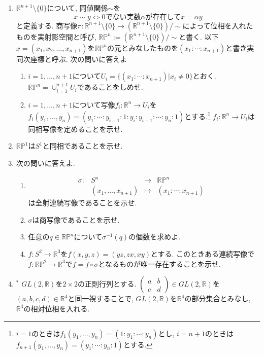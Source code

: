 \documentclass[dvipdfmx,a4paper,11pt]{article}
\newcommand{\R}{\mathbb{R}}
\theoremstyle{definition}
\begin{document}
\begin{enumerate}[ label=\textbf{問}6.\arabic*]
\item $\R^{n+1} \setminus \{ 0\}$について, 同値関係$\sim$を
	$$
	x \sim y \Leftrightarrow \text{0でない実数$\alpha$が存在して$x = \alpha y$}
	$$
	と定義する. 商写像$\pi : \R^{n+1} \setminus \{ 0\} \rightarrow (\R^{n+1} \setminus \{ 0\})/\sim$によって位相を入れたものを実射影空間と呼び, $ \R\mathbb{P}^{n}:= (\R^{n+1} \setminus \{ 0\})/\sim$と書く.  以下$x= (x_{1}, x_{2}, \ldots, x_{n+1})$を$\R\mathbb{P}^{n}$の元とみなしたものを$(x_{1}: \cdots : x_{n+1})$と書き実同次座標と呼ぶ. 
次の問いに答えよ
	\begin{enumerate}
	\item $i=1,\ldots, n+1$について$U_{i} = \{(x_{1}: \cdots : x_{n+1}) | x_i \neq 0\}$とおく. $\R\mathbb{P}^{n} = \cup_{i=1}^{n+1}U_i$であることをしめせ.
    	\item $i=1,\ldots, n+1$について写像$f_i : \R^{n} \rightarrow U_i$を$f_i(y_1, \ldots,y_{n})=(y_1: \cdots :y_{i-1}:1:y_i:y_{i+1}:\cdots : y_{n}:1 )$とする.\footnote{$i=1$のときは$f_1(y_1, \ldots,y_{n})=(1:y_1:\cdots : y_{n} )$とし, $i=n+1$のときは$f_{n+1}(y_1, \ldots,y_{n})=(y_1:\cdots : y_{n}:1 )$とする.}
	$f_i : \R^{n} \rightarrow U_i$は同相写像を定めることを示せ.
	\end{enumerate}
\item $ \R\mathbb{P}^{1}$は$S^1$と同相であることを示せ.
\item 次の問いに答えよ.	
	\begin{enumerate}
	\item 
	$$
\begin{array}{ccccc}
\sigma: &S^{n}& \rightarrow & \R\mathbb{P}^{n}& \\
&(x_{1}, \ldots, x_{n+1}) & \longmapsto & 
(x_{1}: \cdots : x_{n+1})&
\end{array}
$$
は全射連続写像であることを示せ.
	\item $\sigma$は商写像であることを示せ. 
	\item 任意の$q \in \R\mathbb{P}^{n}$について$\sigma^{-1}(q)$の個数を求めよ.
	\item $f : S^2 \rightarrow \R^3$を$f(x,y,z)=(yz,zx,xy)$とする.  このときある連続写像で$\tilde{f}: \R\mathbb{P}^{2} \rightarrow \R^3$で$f =\tilde{f} \circ  \sigma$となるものが唯一存在することを示せ. 

	\end{enumerate}
\item$^{*}$
$GL(2, \R) $を$2 \times 2$の正則行列とする. $\begin{pmatrix}
a & b\\
c& d
\end{pmatrix}
\in GL(2, \R) $を$(a,b,c,d) \in \R^4$と同一視することで, $GL(2, \R)$を$\R^4$の部分集合とみなし, $\R^4$の相対位相を入れる.


\end{enumerate}
\end{document}
